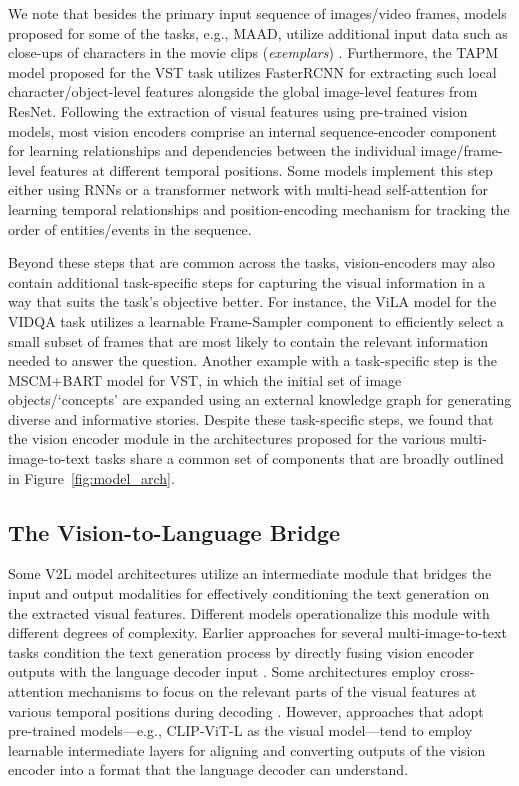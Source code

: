 We note that besides the primary input sequence of images/video frames, models proposed for some of the tasks, e.g., \color{xkcdVividBlue}MAAD\color{black}, utilize additional input data such as close-ups of characters in the movie clips (\textit{exemplars}) \cite{maad2}. Furthermore, the TAPM \cite{vist_tapm} model proposed for the \color{xkcdVividBlue}VST \color{black} task utilizes FasterRCNN \cite{faster-rcnn} for extracting such local character/object-level features alongside the global image-level features from ResNet. Following the extraction of visual features using pre-trained vision models, most vision encoders comprise an internal sequence-encoder component for learning relationships and dependencies between the individual image/frame-level features at different temporal positions. Some models implement this step either using RNNs or a transformer network with multi-head self-attention for learning temporal relationships and position-encoding mechanism for tracking the order of entities/events in the sequence.

Beyond these steps that are common across the tasks, vision-encoders may also contain additional task-specific steps for capturing the visual information in a way that suits the task's objective better. For instance, the ViLA model \cite{videoqa_vila} for the \color{xkcdVividBlue}VIDQA \color{black} task utilizes a learnable Frame-Sampler component to efficiently select a small subset of frames that are most likely to contain the relevant information needed to answer the question. Another example with a task-specific step is the MSCM+BART  model \cite{vist_kg2} for \color{xkcdVividBlue}VST\color{black}, in which the initial set of image objects/`concepts' are expanded using an external knowledge graph for generating diverse and informative stories.
Despite these task-specific steps, we found that the vision encoder module in the architectures proposed for the various multi-image-to-text tasks share a common set of components that are broadly outlined in Figure~\ref{fig:model_arch}.

\subsection{The Vision-to-Language Bridge}

Some V2L model architectures utilize an intermediate module that bridges the input and output modalities for effectively conditioning the text generation on the extracted visual features. Different models operationalize this module with different degrees of complexity. Earlier approaches for several multi-image-to-text tasks condition the text generation process by directly fusing vision encoder outputs with the language decoder input \cite{vist_glacnet}. Some architectures employ cross-attention mechanisms to focus on the relevant parts of the visual features at various temporal positions during decoding \cite{vc_task}. However, approaches that adopt pre-trained models---e.g., CLIP-ViT-L \cite{clip} as the visual model---tend to employ learnable intermediate layers for aligning and converting outputs of the vision encoder into a format that the language decoder can understand.

